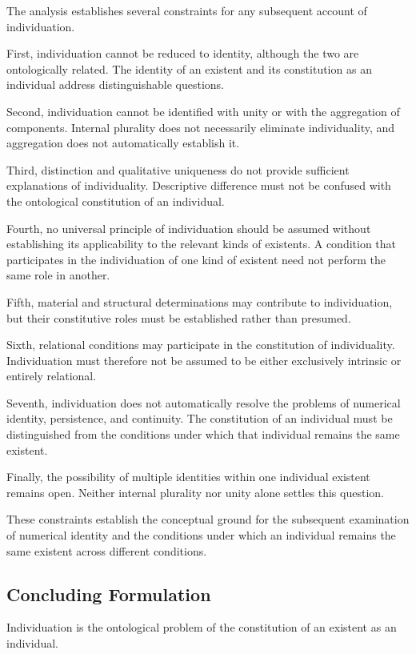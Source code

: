 The analysis establishes several constraints for
any subsequent account of individuation.

First, individuation cannot be reduced to identity,
although the two are ontologically related. The
identity of an existent and its constitution as
an individual address distinguishable questions.

Second, individuation cannot be identified with unity
or with the aggregation of components. Internal
plurality does not necessarily eliminate individuality,
and aggregation does not automatically establish it.

Third, distinction and qualitative uniqueness do not
provide sufficient explanations of individuality.
Descriptive difference must not be confused with
the ontological constitution of an individual.

Fourth, no universal principle of individuation should
be assumed without establishing its applicability
to the relevant kinds of existents. A condition that
participates in the individuation of one kind of
existent need not perform the same role in another.

Fifth, material and structural determinations may
contribute to individuation, but their constitutive
roles must be established rather than presumed.

Sixth, relational conditions may participate in the
constitution of individuality. Individuation must
therefore not be assumed to be either exclusively
intrinsic or entirely relational.

Seventh, individuation does not automatically resolve
the problems of numerical identity, persistence,
and continuity. The constitution of an individual
must be distinguished from the conditions under
which that individual remains the same existent.

Finally, the possibility of multiple identities within
one individual existent remains open. Neither internal
plurality nor unity alone settles this question.

These constraints establish the conceptual ground
for the subsequent examination of numerical identity
and the conditions under which an individual remains
the same existent across different conditions.

\subsection{Concluding Formulation}

Individuation is the ontological problem of the
constitution of an existent as an individual.

